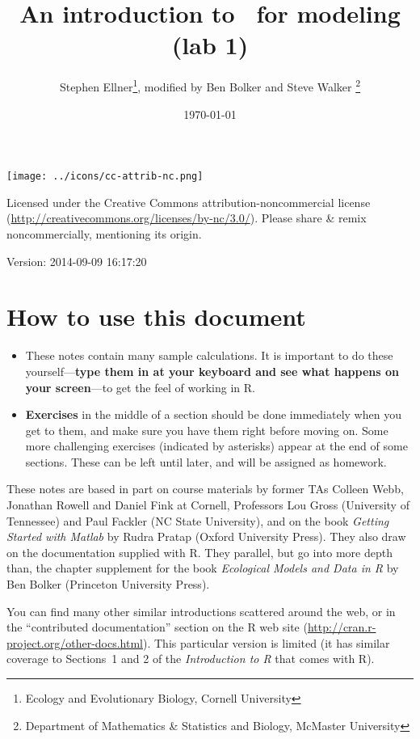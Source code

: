 \documentclass[11pt]{article}\usepackage[]{graphicx}\usepackage[]{color}
\title{An introduction to \R\ for modeling (lab 1)}
\date{\today}
\author{Stephen Ellner\thanks{Ecology and Evolutionary Biology,
    Cornell University}, modified by Ben Bolker and Steve Walker
  \thanks{Department of Mathematics \& Statistics and Biology,
    McMaster University}}
\newcommand\R{{\sf R}}
\newcounter{exercise}
\numberwithin{exercise}{section}
\begin{document}
\maketitle

\texttt{[image: ../icons/cc-attrib-nc.png]}

\begin{minipage}[b]{3in}
{\small Licensed under the Creative Commons 
  attribution-noncommercial license
(\url{http://creativecommons.org/licenses/by-nc/3.0/}).
Please share \& remix noncommercially,
mentioning its origin.}
\end{minipage}

Version: 2014-09-09 16:17:20
  
\addtocounter{section}{-1}
\section{How to use this document}





\begin{itemize}
\item These notes contain many sample calculations. It is important to 
do these yourself---\textbf{type them in at your keyboard and see what
happens on your screen}---to get the 
feel of working in \R. 
\item \textbf{Exercises} in the middle of a section should be done
immediately when you get to them, and make sure you have them right 
before moving on. Some more challenging exercises 
(indicated by asterisks) appear at the end of some sections. These
can be left until later, and will be assigned as homework.   
\end{itemize}

These notes are based in part on course materials by former TAs
Colleen Webb, Jonathan Rowell and Daniel Fink at Cornell, Professors
Lou Gross (University of Tennessee) and Paul Fackler (NC State
University), and on the book \emph{Getting Started with Matlab} by
Rudra Pratap (Oxford University Press).  They also draw on the
documentation supplied with \R.  They parallel, but go into 
more depth than, the chapter supplement for the book
\emph{Ecological Models and Data in \R} by Ben Bolker (Princeton University Press).

You can find many other similar introductions scattered around the
web, or in the ``contributed documentation'' section on the R web site
(\url{http://cran.r-project.org/other-docs.html}).  This particular
version is limited (it has similar coverage to Sections~1 and 2 of the
\emph{Introduction to \R} that comes with \R).
\end{document}
